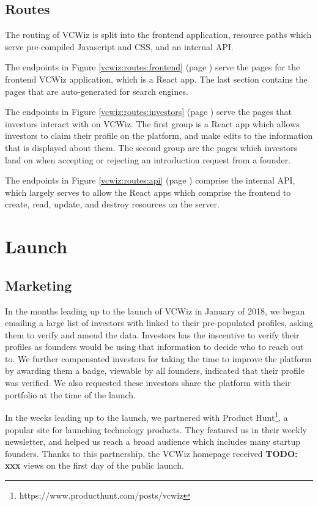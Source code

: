 \subsection{Routes}

The routing of VCWiz is split into the frontend application, resource paths which serve pre-compiled Javascript and CSS, and an internal API.

The endpoints in Figure \ref{vcwiz:routes:frontend} (page \pageref{vcwiz:routes:frontend}) serve the pages for the frontend VCWiz application, which is a React app. The last section contains the pages that are auto-generated for search engines.

The endpoints in Figure \ref{vcwiz:routes:investors} (page \pageref{vcwiz:routes:investors}) serve the pages that investors interact with on VCWiz. The first group is a React app which allows investors to claim their profile on the platform, and make edits to the information that is displayed about them. The second group are the pages which investors land on when accepting or rejecting an introduction request from a founder.

The endpoints in Figure \ref{vcwiz:routes:api} (page \pageref{vcwiz:routes:api}) comprise the internal API, which largely serves to allow the React apps which comprise the frontend to create, read, update, and destroy resources on the server.

\section{Launch}

\subsection{Marketing}

In the months leading up to the launch of VCWiz in January of 2018, we began emailing a large list of investors with linked to their pre-populated profiles, asking them to verify and amend the data. Investors has the inscentive to verify their profiles as founders would be using that information to decide who to reach out to. We further compensated investors for taking the time to improve the platform by awarding them a badge, viewable by all founders, indicated that their profile was verified. We also requested these investors share the platform with their portfolio at the time of the launch.

In the weeks leading up to the launch, we partnered with Product Hunt\footnote{https://www.producthunt.com/posts/vcwiz}, a popular site for launching technology products. They featured us in their weekly newsletter, and helped us reach a broad audience which includes many startup founders. Thanks to this partnership, the VCWiz homepage received \textbf{TODO: xxx} views on the first day of the public launch.

